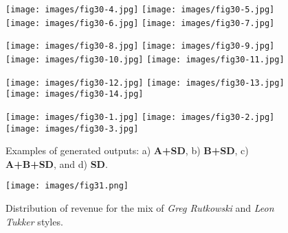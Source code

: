 \documentclass[12pt, letterpaper]{article}
\begin{document}
\begin{figure}[h]
    \centering
    \begin{minipage}{\textwidth}
        \centering
        \texttt{[image: images/fig30-4.jpg]}
        \texttt{[image: images/fig30-5.jpg]}
        \texttt{[image: images/fig30-6.jpg]}
        \texttt{[image: images/fig30-7.jpg]}
        \label{fig30:row_a}
    \end{minipage}
    \begin{minipage}{\textwidth}
        \centering
        \texttt{[image: images/fig30-8.jpg]}
        \texttt{[image: images/fig30-9.jpg]}
        \texttt{[image: images/fig30-10.jpg]}
        \texttt{[image: images/fig30-11.jpg]}
        \label{fig30:row_b}
    \end{minipage}
    \begin{minipage}{\textwidth}
        \centering
        \texttt{[image: images/fig30-12.jpg]}
        \texttt{[image: images/fig30-13.jpg]}
        \texttt{[image: images/fig30-14.jpg]}
        \label{fig30:row_c}
    \end{minipage}
    \begin{minipage}{\textwidth}
        \centering
        \texttt{[image: images/fig30-1.jpg]}
        \texttt{[image: images/fig30-2.jpg]}
        \texttt{[image: images/fig30-3.jpg]}
        \label{fig30:row_d}
    \end{minipage}
    \caption{Examples of generated outputs: a) \textbf{A+SD}, b) \textbf{B+SD}, c) \textbf{A+B+SD}, and d) \textbf{SD}.}
    \label{fig30:all_images}
\end{figure}

\begin{figure}[h]
    \centering
    \texttt{[image: images/fig31.png]}
    \caption{Distribution of revenue for the mix of \textit{Greg Rutkowski} and \textit{Leon Tukker} styles.}
    \label{fig31:image1}
\end{figure}
\end{document}
